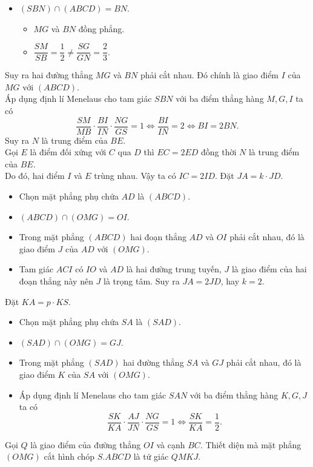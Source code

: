 \begin{ex}
{\begin{itemchoice}
\begin{itemize}
				\item  $(SBN)\cap (ABCD)=BN$.
				\begin{itemize}
					 \item[+] $MG$ và $BN$ đồng phẳng.
					\item[+]  $\dfrac{SM}{SB}=\dfrac{1}{2}\neq \dfrac{SG}{GN}=\dfrac{2}{3}.$
				\end{itemize}
			\end{itemize}
			Suy ra hai đường thẳng $MG$ và $BN$ phải cắt nhau. Đó chính là giao điểm  $I$ của $MG$ với $(ABCD)$.\\
			Áp dụng định lí Menelaus cho  tam giác $SBN$ với ba điểm thẳng hàng $M, G, I$ ta có
			$$\dfrac{SM}{MB}\cdot\dfrac{BI}{IN}\cdot\dfrac{NG}{GS}=1\Leftrightarrow \dfrac{BI}{IN}=2\Leftrightarrow  BI=2BN.$$
			Suy ra $N$ là trung  điểm của $BE$.\\
			Gọi $E$ là điểm đối xứng với $C$ qua $D$ thì $EC=2ED$ đồng thời $N$ là  trung điểm của $BE$.\\
			Do đó, hai điểm $I$ và $E$  trùng nhau. Vậy ta có $IC=2ID$.
			\itemch 
			 Đặt $JA=k \cdot JD$.
			\begin{itemize}
				\item  Chọn mặt phẳng phụ chứa $AD$ là $(ABCD)$.
				\item $(ABCD)\cap (OMG)=OI$. 
				\item  Trong mặt phẳng $(ABCD)$ hai đoạn thẳng $AD$ và $OI$ phải cắt nhau, đó là giao điểm $J$ của $AD$ với $(OMG)$.
				\item Tam giác $ACI$ có $IO$ và $AD$ là hai đường trung tuyến, $J$ là giao điểm của hai đoạn thẳng này nên $J$ là trọng tâm. Suy ra  $JA=2JD$, hay $k=2$.
			\end{itemize}
			 \itemch
			Đặt $KA=p \cdot  KS$.
			\begin{itemize}
				\item Chọn  mặt phẳng phụ chứa $SA$ là $(SAD)$.
				\item  $(SAD)\cap (OMG)=GJ$.
				\item Trong mặt phẳng $(SAD)$ hai đường thẳng $SA$  và $GJ$ phải cắt nhau, đó là giao điểm $K$ của $SA$ với $(OMG)$.
				\item Áp dụng định lí Menelaus cho tam giác $SAN$ với ba điểm thẳng  hàng $K, G, J$ ta có
				$$\dfrac{SK}{KA}\cdot\dfrac{AJ}{JN}\cdot\dfrac{NG}{GS}=1\Leftrightarrow \dfrac{SK}{KA}=\dfrac{1}{2}.$$ 
			\end{itemize}
			 \itemch
			Gọi $Q$ là giao điểm của đường thẳng $OI$ và cạnh $BC$. Thiết diện mà mặt phẳng $(OMG)$ cắt hình chóp $S.ABCD$ là tứ  giác $QMKJ$.

\end{itemchoice}}
\end{ex}
